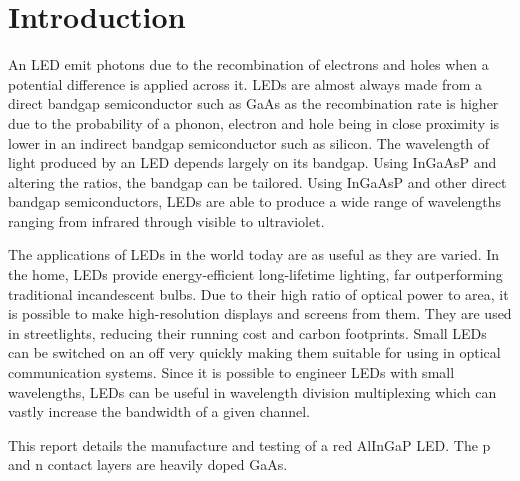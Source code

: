 \newpage
\section{Introduction}
\label{sec:intro}

An LED emit photons due to the recombination of electrons and holes when a potential difference is applied across it. LEDs are almost always made from a direct bandgap semiconductor such as GaAs as the recombination rate is higher due to the probability of a phonon, electron and hole being in close proximity is lower in an indirect bandgap semiconductor such as silicon. The wavelength of light produced by an LED depends largely on its bandgap. Using InGaAsP and altering the ratios, the bandgap can be tailored. Using InGaAsP and other direct bandgap semiconductors, LEDs are able to produce a wide range of wavelengths ranging from infrared through visible to ultraviolet.

The applications of LEDs in the world today are as useful as they are varied. In the home, LEDs provide energy-efficient long-lifetime lighting, far outperforming traditional incandescent bulbs. Due to their high ratio of optical power to area, it is possible to make high-resolution displays and screens from them. They are used in streetlights, reducing their running cost and carbon footprints. Small LEDs can be switched on an off very quickly making them suitable for using in optical communication systems. Since it is possible to engineer LEDs with small wavelengths, LEDs can be useful in wavelength division multiplexing which can vastly increase the bandwidth of a given channel.

This report details the manufacture and testing of a red AlInGaP LED. The p and n contact layers are heavily doped GaAs.


